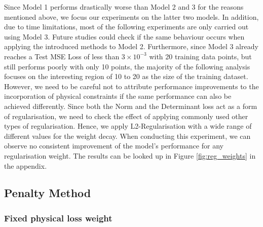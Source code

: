 \indent Since Model 1 performs drastically worse than Model 2 and 3 for the reasons mentioned above, we focus our experiments on the latter two models. In addition, due to time limitations, most of the following experiments are only carried out using Model 3. Future studies could check if the same behaviour occurs when applying the introduced methods to Model 2. Furthermore, since Model 3 already reaches a Test MSE Loss of less than $3\times10^{-3}$ with 20 training data points, but still performs poorly with only 10 points, the majority of the following analysis focuses on the interesting region of 10 to 20 as the size of the training dataset. \\
\indent However, we need to be careful not to attribute performance improvements to the incorporation of physical constraints if the same performance can also be achieved differently. Since both the Norm and the Determinant loss act as a form of regularisation, we need to check the effect of applying commonly used other types of regularisation. Hence, we apply L2-Regularisation with a wide range of different values for the weight decay. When conducting this experiment, we can observe no consistent improvement of the model's performance for any regularisation weight. The results can be looked up in Figure \ref{fig:reg_weights} in the appendix.

\subsection{Penalty Method}
\subsubsection{Fixed physical loss weight}

